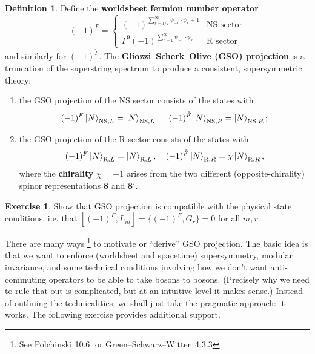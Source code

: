 \documentclass{report}
\theoremstyle{plain}
\theoremstyle{definition}
\newtheorem{definition}[theorem]{Definition}
\newtheorem{exercise}{Exercise}[section]
\theoremstyle{remark}
\newcommand{\rep}[1]{\mathbf{#1}}
\newcommand{\NS}{\mathrm{NS}}
\newcommand{\R}{\mathrm{R}}
\begin{document}
\begin{definition}
  Define the {\bf worldsheet fermion number operator}
  \[ (-1)^F = \begin{cases} (-1)^{\sum_{r=1/2}^\infty \psi_{-r} \cdot \psi_r + 1} & \text{NS sector} \\ \Gamma^9 (-1)^{\sum_{r=1}^\infty \psi_{-r} \cdot \psi_r} & \text{R sector} \end{cases} \]
  and similarly for $(-1)^{\tilde{F}}$. The {\bf
    Gliozzi--Scherk--Olive (GSO) projection} is a truncation of the
  superstring spectrum to produce a consistent, supersymmetric theory:
  \begin{enumerate}
  \item the GSO projection of the NS sector consists of the states
    with
    \[ (-1)^F \ket{N}_{\NS,L} = \ket{N}_{\NS,L}, \quad (-1)^{\tilde{F}} \ket{N}_{\NS,R} = \ket{N}_{\NS,R}; \]
  \item the GSO projection of the R sector consists of the states with
    \[ (-1)^F \ket{N}_{\R,L} = \ket{N}_{\R,L}, \quad (-1)^{\tilde{F}} \ket{N}_{\R,R} = \chi \ket{N}_{\R,R}, \]
    where the {\bf chirality} $\chi = \pm 1$ arises from the two
    different (opposite-chirality) spinor representations $\rep{8}$
    and $\rep{8}'$.
  \end{enumerate}
\end{definition}

\begin{exercise}
  Show that GSO projection is compatible with the physical state
  conditions, i.e. that $[(-1)^F, L_m] = \{(-1)^F, G_r\} = 0$ for all
  $m, r$.
\end{exercise}

There are many ways \footnote{See Polchinski 10.6, or
  Green--Schwarz--Witten 4.3.3} to motivate or ``derive'' GSO
projection. The basic idea is that we want to enforce (worldsheet and
spacetime) supersymmetry, modular invariance, and some technical
conditions involving how we don't want anti-commuting operators to be
able to take bosons to bosons. (Precisely why we need to rule that out
is complicated, but at an intuitive level it makes sense.) Instead of
outlining the technicalities, we shall just take the pragmatic
approach: it works. The following exercise provides additional
support.
\end{document}
